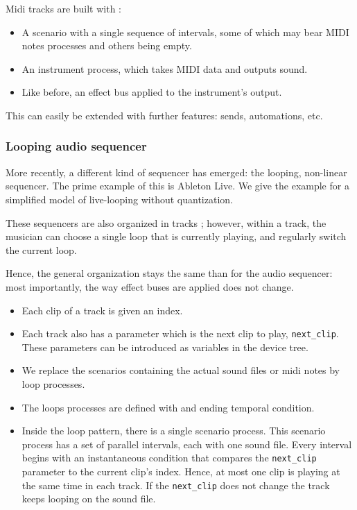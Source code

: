 \documentclass[applsci,article,submit,moreauthors,pdftex,10pt,a4paper]{mdpi}
\begin{document}
Midi tracks are built with : 
\begin{itemize}
    \item A scenario with a single sequence of intervals, some of which may bear MIDI notes processes and others being empty.
    \item An instrument process, which takes MIDI data and outputs sound.
    \item Like before, an effect bus applied to the instrument's output.
\end{itemize}

This can easily be extended with further features: sends, automations, etc.
\subsubsection{Looping audio sequencer}
More recently, a different kind of sequencer has emerged: the looping, non-linear sequencer. 
The prime example of this is Ableton Live. We give the example for a simplified model of live-looping without quantization.

These sequencers are also organized in tracks ; however, within a track, the musician can choose a single loop 
that is currently playing, and regularly switch the current loop.

Hence, the general organization stays the same than for the audio sequencer: most importantly, the way effect buses are applied does not change.

\begin{itemize}
    \item Each clip of a track is given an index. 
    \item Each track also has a parameter which is the next clip to play, \lstinline|next_clip|. These parameters can be introduced as variables in the device tree.
    \item We replace the scenarios containing the actual sound files or midi notes by loop processes. 
    \item The loops processes are defined with and ending temporal condition. 
    \item Inside the loop pattern, there is a single scenario process. This scenario process has a set of parallel intervals, each with one sound file. Every interval begins with an instantaneous condition that compares the \lstinline|next_clip| parameter to the current clip's index. Hence, at most one clip is playing at the same time in each track. If the \lstinline|next_clip| does not change the track keeps looping on the sound file.
\end{itemize}
\end{document}
